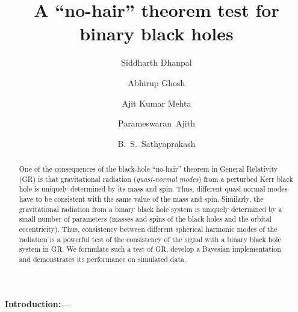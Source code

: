 \documentclass[prl,preprintnumbers,twocolumn,eqsecnum,floatfix,a4paper,nofootinbib,superscriptaddress]{revtex4}
\begin{document}
\title{A ``no-hair'' theorem test for binary black holes}

\author{Siddharth Dhanpal}
\author{Abhirup Ghosh}
\author{Ajit Kumar Mehta}
\author{Parameswaran~Ajith}
\author{B.~S.~Sathyaprakash}

\begin{abstract}
One of the consequences of the black-hole ``no-hair'' theorem in General Relativity (GR) is that gravitational radiation (\emph{quasi-normal modes}) from a perturbed Kerr black hole is uniquely determined by its mass and spin. Thus, different quasi-normal modes have to be consistent with the same value of the mass and spin. Similarly, the gravitational radiation from a binary black hole system is uniquely determined by a small number of parameters (masses and spins of the black holes and the orbital eccentricity). Thus, consistency between different spherical harmonic modes of the radiation is a powerful test of the consistency of the signal with a binary black hole system in GR. We formulate such a test of GR, develop a Bayesian implementation and demonstrates its performance on simulated data. 
\end{abstract}
\maketitle
\paragraph{Introduction:---}
\end{document}
